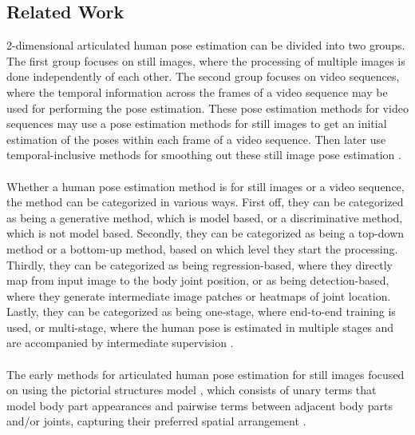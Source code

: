 \documentclass[./main.tex]{subfiles}
\begin{document}
\subsection{Related Work}
\label{subsec:related_work}
2-dimensional articulated human pose estimation can be divided into two groups. The first group focuses on still images, where the processing of multiple images is done independently of each other. The second group focuses on video sequences, where the temporal information across the frames of a video sequence may be used for performing the pose estimation. These pose estimation methods for video sequences may use a pose estimation methods for still images to get an initial estimation of the poses within each frame of a video sequence. Then later use temporal-inclusive methods for smoothing out these still image pose estimation \cite{Chen_2020}.
\\
\\
Whether a human pose estimation method is for still images or a video sequence, the method can be categorized in various ways. First off, they can be categorized as being a generative method, which is model based, or a discriminative method, which is not model based. Secondly, they can be categorized as being a top-down method or a bottom-up method, based on which level they start the processing. Thirdly, they can be categorized as being regression-based, where they directly map from input image to the body joint position, or as being detection-based, where they generate intermediate image patches or heatmaps of joint location. Lastly, they can be categorized as being one-stage, where end-to-end training is used, or multi-stage, where the human pose is estimated in multiple stages and are accompanied by intermediate supervision \cite{Chen_2020}.
\\
\\
The early methods for articulated human pose estimation for still images focused on using the pictorial structures model \cite{fischler1973representation}, which consists of unary terms that model body part appearances and pairwise terms between adjacent body parts and/or joints, capturing their preferred spatial arrangement \cite{Pishchulin_2013_CVPR, andriluka2012discriminative, johnson2011learning, yang2011articulated}.
\\
\\
\end{document}
